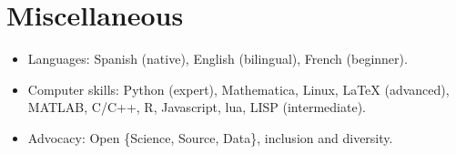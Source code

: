 \documentclass[12pt,]{scrartcl}
\begin{document}
\section{Miscellaneous}\label{misc}

\begin{itemize}
\leftskip-0.25in

\item Languages: Spanish (native), English (bilingual), French (beginner).

\item Computer skills: Python (expert), Mathematica, Linux, LaTeX (advanced), MATLAB, C/C++, R, Javascript, lua, LISP (intermediate).

\item Advocacy: Open \{Science, Source, Data\}, inclusion and diversity.

\end{itemize}
\end{document}
